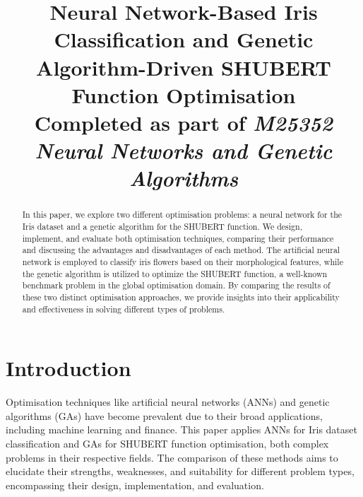 \documentclass[conference]{inc/IEEEtran}
\begin{document}
\title{Neural Network-Based Iris Classification and Genetic Algorithm-Driven SHUBERT Function Optimisation \\
{\footnotesize Completed as part of \textit{M25352 Neural Networks and Genetic Algorithms}}
}


\author{
  \and
}

\maketitle

\begin{abstract}
  In this paper, we explore two different optimisation problems: a neural network for the Iris dataset and a genetic algorithm for the SHUBERT function. We design, implement, and evaluate both optimisation techniques, comparing their performance and discussing the advantages and disadvantages of each method. The artificial neural network is employed to classify iris flowers based on their morphological features, while the genetic algorithm is utilized to optimize the SHUBERT function, a well-known benchmark problem in the global optimisation domain. By comparing the results of these two distinct optimisation approaches, we provide insights into their applicability and effectiveness in solving different types of problems.
\end{abstract}

\section{Introduction}

Optimisation techniques like artificial neural networks (ANNs) and genetic algorithms (GAs) have become prevalent due to their broad applications, including machine learning and finance. This paper applies ANNs for Iris dataset classification and GAs for SHUBERT function optimisation, both complex problems in their respective fields. The comparison of these methods aims to elucidate their strengths, weaknesses, and suitability for different problem types, encompassing their design, implementation, and evaluation.
\end{document}
